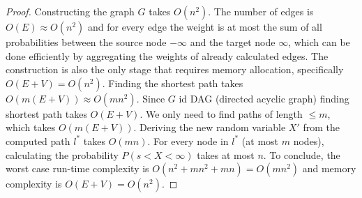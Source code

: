 \documentclass{article}
\begin{document}
\begin{proof}
	Constructing the graph $G$ takes $O(n^2)$. The number of edges is $O(E)\approx O(n^2)$ and for every edge the weight is at most the sum of all probabilities between the source node $-\infty$ and the target node $\infty$, which can be done efficiently by aggregating the weights of already calculated edges. 
	The construction is also the only stage that requires memory allocation, specifically $O(E+V)=O(n^2)$.
	Finding the shortest path takes $O(m(E+V))\approx O(mn^2)$. Since $G$ id DAG (directed acyclic graph) finding shortest path takes $O(E+V)$. We only need to find paths of length $\leq m$, which takes $O(m(E+V))$.
	Deriving the new random variable $X'$ from the computed path $l^*$ takes $O(mn)$. For every node in $l^*$ (at most $m$ nodes), calculating the probability $P(s<X<\infty)$ takes at most $n$. 
	To conclude, the worst case run-time complexity is $O(n^2+mn^2+mn)=O(mn^2)$ and memory complexity is $O(E+V)=O(n^2)$.
\end{proof}
\end{document}
